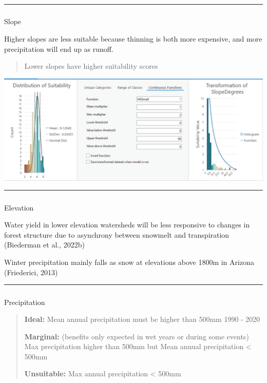 \documentclass[
]{agujournal2019}
\makeatletter
\let\oldsubparagraph\subparagraph
\renewcommand{\subparagraph}{
    \@ifstar
      \xxxSubParagraphStar
      \xxxSubParagraphNoStar
  }
\newcommand{\xxxSubParagraphStar}[1]{\oldsubparagraph*{#1}\mbox{}}
\newcommand{\xxxSubParagraphNoStar}[1]{\oldsubparagraph{#1}\mbox{}}
\makeatother
\begin{document}
\begin{center}\rule{0.5\linewidth}{0.5pt}\end{center}

\subparagraph{Slope}\label{slope}

Higher slopes are less suitable because thinning is both more expensive,
and more precipitation will end up as runoff.

\begin{quote}
Lower slopes have higher suitability scores
\end{quote}

\includegraphics{images/Slope_suitability.PNG}

\begin{center}\rule{0.5\linewidth}{0.5pt}\end{center}

\subparagraph{Elevation}\label{elevation}

Water yield in lower elevation watersheds will be less responsive to
changes in forest structure due to asynchrony between snowmelt and
transpiration (Biederman et al., 2022b)

Winter precipitation mainly falls as snow at elevations above 1800m in
Arizona (Friederici, 2013)

\begin{center}\rule{0.5\linewidth}{0.5pt}\end{center}

\subparagraph{Precipitation}\label{precipitation}

\begin{quote}
\textbf{Ideal:} Mean annual precipitation must be higher than 500mm 1990
- 2020

\textbf{Marginal:} (benefits only expected in wet years or during some
events) Max precipitation higher than 500mm but Mean annual
precipitation \textless{} 500mm

\textbf{Unsuitable:} Max annual precipitation \textless{} 500mm
\end{quote}
\end{document}
